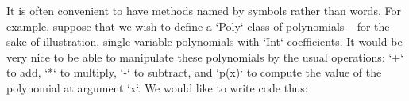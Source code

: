It is often convenient to have methods named by symbols rather than words.
For example, suppose that we wish to define a \xcd`Poly` class of
polynomials -- for the sake of illustration, single-variable polynomials with
\xcd`Int` coefficients.  It would be very nice to be able to manipulate these
polynomials by the usual operations: \xcd`+` to add, \xcd`*` to multiply,
\xcd`-` to subtract, and \xcd`p(x)` to compute the value of the polynomial at
argument \xcd`x`.  We would like to write code thus: 
%
%
%
%
%
%
%
%
%
%


